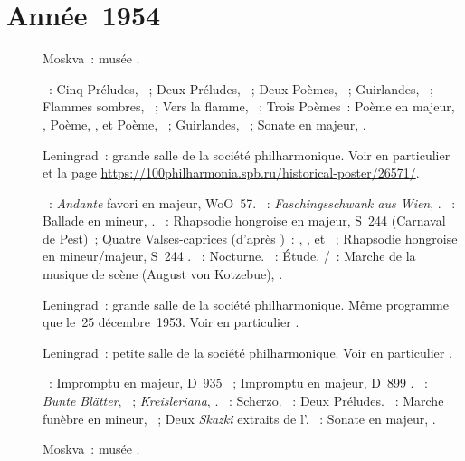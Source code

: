 \section{Année~1954}

\begin{description}
 \item[]
 Moskva~: musée \Scriabine{}.

 \textsc{\Scriabine{}}~: Cinq Préludes, ~; Deux Préludes,
 ~; Deux Poèmes, ~; Guirlandes,  ~;
 Flammes sombres,  ~; Vers la flamme, ~; Trois
 Poèmes~: Poème en \kC majeur,  , Poème, 
 , et Poème,  ~; Guirlandes, 
 ~; Sonate en \kF \Sharp majeur, .
 \item[]
 Leningrad~: grande salle de la société philharmonique.
 Voir en particulier \citet[p.~444]{Milshteyn82a} et la page
 \href{https://100philharmonia.spb.ru/historical-poster/26571/}%
 {https://100philharmonia.spb.ru/historical-poster/26571/}.

 \textsc{\Beethoven{}}~: \emph{Andante} favori en \kF majeur, WoO~57.
 \textsc{\Schumann{}}~: \emph{Faschingsschwank aus Wien}, .
 \textsc{\Chopin{}}~: Ballade en \kG mineur, .
 \textsc{\Liszt{}}~: Rhapsodie hongroise  en \kE \Flat majeur,
 S~244  (Carnaval de Pest)~; Quatre Valses-caprices (d'après
 \Schubert{})~: , ,  et ~; Rhapsodie
 hongroise  en \kC \Sharp mineur/\kF \Sharp majeur, S~244
 .
 \textsc{\Mendelssohn{}}~: Nocturne.
 \textsc{\Grieg{}}~: Étude.
 \textsc{\Beethoven{}/\Rubinstein{}}~: Marche de la musique de scène
  (August von Kotzebue), 
 .
 \item[]
 Leningrad~: grande salle de la société philharmonique.
 Même programme que le~25 décembre~1953.
 Voir en particulier \citet[p.~444]{Milshteyn82a}.
 \item[]
 Leningrad~: petite salle de la société philharmonique.
 Voir en particulier \citet[p.~444]{Milshteyn82a}.

 \textsc{\Schubert{}}~: Impromptu en \kA \Flat majeur, D~935 ~;
 Impromptu en \kG \Flat majeur, D~899 .
 \textsc{\Schumann{}}~: \emph{Bunte Blätter}, ~;
 \emph{Kreisleriana}, .
 \textsc{\Chopin{}}~: Scherzo.
 \textsc{\Rachmaninov{}}~: Deux Préludes.
 \textsc{\Medtner{}}~: Marche funèbre en \kB mineur,  ~;
 Deux \emph{Skazki} extraits de l'.
 \textsc{\Scriabine{}}~: Sonate en \kF \Sharp majeur, .
 \item[]
 Moskva~: musée \Scriabine{}.


\end{description}
